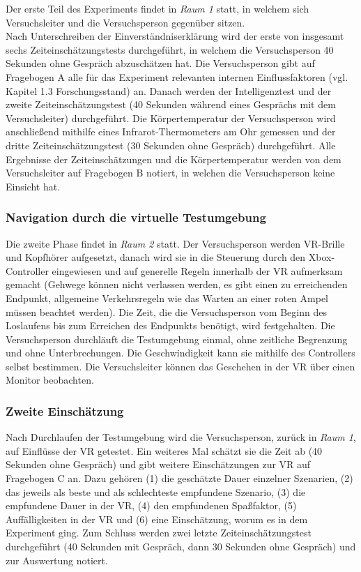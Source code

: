 \documentclass{Paper}
\begin{document}
Der erste Teil des Experiments findet in \textit{Raum 1} statt, in welchem sich Versuchsleiter und die Versuchsperson gegenüber sitzen.\\
Nach Unterschreiben der Einverständniserklärung wird der erste von insgesamt sechs Zeiteinschätzungstests durchgeführt, in welchem die Versuchsperson 40 Sekunden ohne Gespräch abzuschätzen hat. Die Versuchsperson gibt auf Fragebogen A alle für das Experiment relevanten internen Einflussfaktoren (vgl. Kapitel 1.3  Forschungsstand) an.
Danach werden der Intelligenztest und der zweite Zeiteinschätzungstest (40 Sekunden während eines Gesprächs mit dem Versuchsleiter) durchgeführt. Die Körpertemperatur der Versuchsperson wird anschließend mithilfe eines Infrarot-Thermometers am Ohr gemessen und der dritte Zeiteinschätzungstest (30 Sekunden ohne Gespräch) durchgeführt.
Alle Ergebnisse der Zeiteinschätzungen und die
Körpertemperatur werden von dem Versuchsleiter auf Fragebogen B notiert, in welchen die Versuchsperson keine Einsicht hat.

\subsubsection{Navigation durch die virtuelle Testumgebung}
Die zweite Phase findet in \textit{Raum 2} statt. Der Versuchsperson werden VR-Brille und Kopfhörer aufgesetzt, danach wird sie in die Steuerung durch den Xbox-Controller eingewiesen und auf generelle Regeln innerhalb der VR aufmerksam gemacht (Gehwege können nicht verlassen werden, es gibt einen zu erreichenden Endpunkt, allgemeine Verkehrsregeln wie das Warten an einer roten Ampel müssen beachtet werden). 
Die Zeit, die die Versuchsperson vom Beginn des Loslaufens bis zum Erreichen des Endpunkts benötigt, wird festgehalten.
Die Versuchsperson durchläuft die Testumgebung einmal, ohne zeitliche Begrenzung und ohne Unterbrechungen. Die Geschwindigkeit kann sie mithilfe des Controllers selbst bestimmen. Die Versuchsleiter können das Geschehen in der VR über einen Monitor beobachten.

\subsubsection{Zweite Einschätzung}
Nach Durchlaufen der Testumgebung wird die Versuchsperson, zurück in \textit{Raum 1}, auf Einflüsse der VR getestet. Ein weiteres Mal schätzt sie die Zeit ab (40 Sekunden ohne Gespräch) und gibt weitere Einschätzungen zur VR auf Fragebogen C an. Dazu gehören (1) die geschätzte Dauer einzelner Szenarien, (2) das jeweils als beste und als schlechteste empfundene Szenario, (3)  die empfundene Dauer in der VR, (4) den empfundenen Spaßfaktor, (5) Auffälligkeiten in der VR und (6) eine Einschätzung, worum es in dem Experiment ging.
Zum Schluss werden zwei letzte Zeiteinschätzungstest durchgeführt (40 Sekunden mit Gespräch, dann 30 Sekunden ohne Gespräch) und zur Auswertung notiert.
\end{document}
